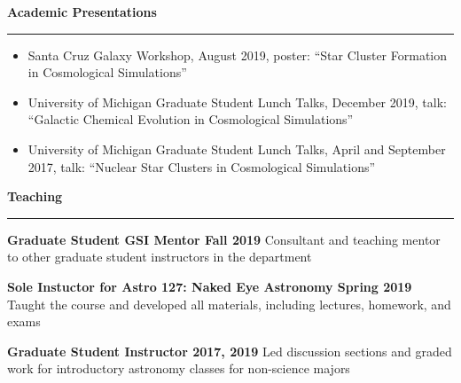 \documentclass[10pt]{article}
\newcommand{\header}[1]{\vspace{2em}\par \textbf{\large #1}\strut\hrule\vspace{0em}}
\newcommand{\actionHeader}[2]{\textbf{#1 \hfill #2}}
\newcommand{\indentedItem}[1]{\newline\null\qquad #1}
\begin{document}
\header{Academic Presentations}
\begin{itemize}
    \item Santa Cruz Galaxy Workshop, August 2019, poster: ``Star Cluster Formation in Cosmological Simulations''
    \item University of Michigan Graduate Student Lunch Talks, December 2019, talk: ``Galactic Chemical Evolution in Cosmological Simulations''
    \item University of Michigan Graduate Student Lunch Talks, April and September 2017, talk: ``Nuclear Star Clusters in Cosmological Simulations''
\end{itemize}

\header{Teaching}

\actionHeader{Graduate Student GSI Mentor}{Fall 2019}
\indentedItem{Consultant and teaching mentor to other graduate student instructors in the department}

\actionHeader{Sole Instuctor for Astro 127: Naked Eye Astronomy}{Spring 2019}
\indentedItem{Taught the course and developed all materials, including lectures, homework, and exams}

\actionHeader{Graduate Student Instructor}{2017, 2019}
\indentedItem{Led discussion sections and graded work for introductory astronomy classes for non-science majors}

\end{document}
